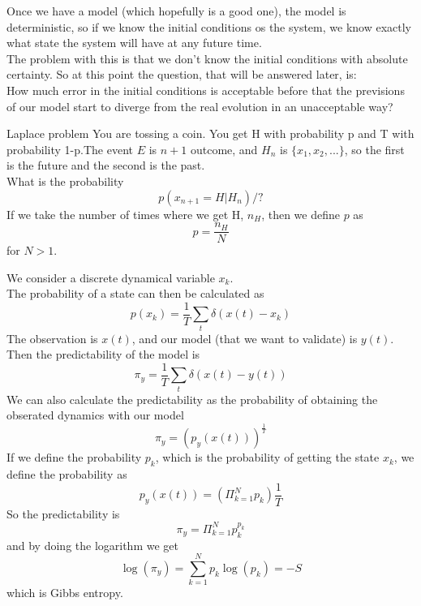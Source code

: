 Once we have a model (which hopefully is a good one), the model is deterministic, so if we know the initial conditions os the system, we know exactly what state the system will have at any future time. \\
The problem with this is that we don't know the initial conditions with absolute certainty. So at this point the question, that will be answered later, is: \\
How much error in the initial conditions is acceptable before that the previsions of our model start to diverge from the real evolution in an unacceptable way?


Laplace problem
You are tossing a coin. You get H with probability p and T with probability 1-p.The event $E$ is $n+1$ outcome, and $H_n$ is $\{x_1,x_2,...\}$, so the first is the future and the second is the past. \\
What is the probability
$$
	p(x_{n+1}=H | H_n) / ? %
$$
If we take the number of times where we get H, $n_H$, then we define $p$ as
$$
	p = \frac{n_H}{N}
$$
for $N > 1$.

We consider a discrete dynamical variable $x_k$. \\
The probability of a state can then be calculated as
$$
	p(x_k) = \frac{1}{T}\sum_t \delta(x(t)-x_k)
$$
The observation is $x(t)$, and our model (that we want to validate) is $y(t)$. Then the predictability of the model is
$$
	\pi_y = \frac{1}{T}\sum_t \delta(x(t)-y(t))
$$
We can also calculate the predictability as the probability of obtaining the obserated dynamics with our model
$$
	\pi_y = \left(p_y(x(t))\right)^\frac{1}{T}
$$
If we define the probability $p_k$, which is the probability of getting the state $x_k$, we define the probability as
$$
	p_y(x(t)) = \left(\Pi_{k=1}^N p_k \right)\frac{1}{T}
$$
So the predictability is
$$
	\pi_y = \Pi_{k=1}^N p_k^{p_k}
$$
and by doing the logarithm we get
$$
	\log(\pi_y) = \sum_{k=1}^N p_k\log(p_k) = -S
$$
which is Gibbs entropy.
	












